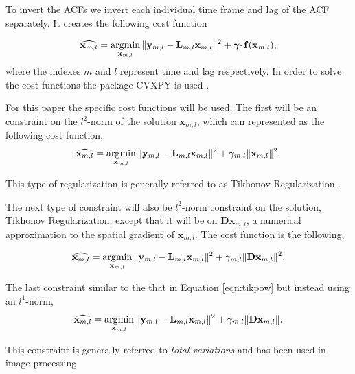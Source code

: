 To invert the ACFs we invert each individual time frame and lag of the ACF separately. It creates the following cost function

\begin{equation}
\label{eqn:lstsqrsvecdblag}
\widehat{\mathbf{x}_{m,l}} = \operatorname*{\arg\!\min}\limits_{\mathbf{x}_{m,l}} \|\mathbf{y}_{m,l} -\mathbf{L}_{m,l}\mathbf{x}_{m,l} \|^2 + \boldsymbol{\gamma}\cdotp\mathbf{f}(\mathbf{x}_{m,l}),
\end{equation}
\noindent where the indexes $m$ and $l$ represent time and lag respectively. In order to solve the cost functions the package CVXPY is used \cite{cvxpy}.

For this paper the specific cost functions will be used. The first will be an constraint on the $l^2$-norm of the solution $\mathbf{x}_{m,l}$, which can represented as the following cost function,
\begin{equation}
\label{eqn:tikpow}
\widehat{\mathbf{x}_{m,l}} = \operatorname*{\arg\!\min}\limits_{\mathbf{x}_{m,l}} \|\mathbf{y}_{m,l} -\mathbf{L}_{m,l}\mathbf{x}_{m,l} \|^2 +\gamma_{m,l} \|\mathbf{x}_{m,l}\|^2.
\end{equation}

\noindent This type of regularization is generally referred to as Tikhonov Regularization \cite{Karl:2005jy}.

The next type of constraint will also be $l^2$-norm constraint on the solution, Tikhonov Regularization, except that it will be on $\mathbf{D}\mathbf{x}_{m,l}$, a numerical approximation to the spatial gradient of $\mathbf{x}_{m,l}$. The cost function is the following,

\begin{equation}
\label{eqn:tikD}
\widehat{\mathbf{x}_{m,l}} = \operatorname*{\arg\!\min}\limits_{\mathbf{x}_{m,l}} \|\mathbf{y}_{m,l} -\mathbf{L}_{m,l}\mathbf{x}_{m,l} \|^2 + \gamma_{m,l} \|\mathbf{D}\mathbf{x}_{m,l}\|^2.
\end{equation}

\noindent The last constraint similar to the that in Equation \ref{eqn:tikpow} but instead using an $l^1$-norm,
\begin{equation}
\label{eqn:tv}
\widehat{\mathbf{x}_{m,l}} = \operatorname*{\arg\!\min}\limits_{\mathbf{x}_{m,l}} \|\mathbf{y}_{m,l} -\mathbf{L}_{m,l}\mathbf{x}_{m,l} \|^2 + \gamma_{m,l} \|\mathbf{D}\mathbf{x}_{m,l}\|.
\end{equation} 

\noindent This constraint is generally referred to \textit{total variations} and has been used in image processing \cite{Rudin:1992kn}

